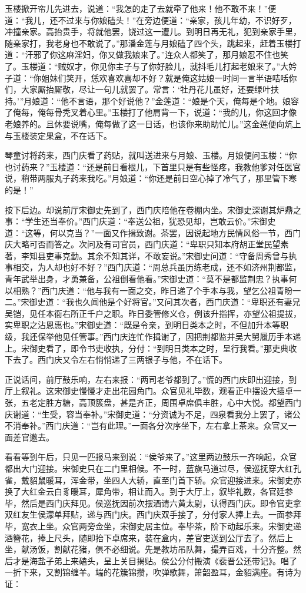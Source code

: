 玉楼掀开帘儿先进去，说道：“我怎的走了去就牵了他来！他不敢不来！”便道：“我儿，还不过来与你娘磕头！”在旁边便道：“亲家，孩儿年幼，不识好歹，冲撞亲家。高抬贵手，将就他罢，饶过这一遭儿。到明日再无礼，犯到亲家手里，随亲家打，我老身也不敢说了。”那潘金莲与月娘磕了四个头，跳起来，赶着玉楼打道：“汗邪了你这麻淫妇，你又做我娘来了。”连众人都笑了，那月娘忍不住也笑了。玉楼道：“贼奴才，你见你主子与了你好脸儿，就抖毛儿打起老娘来了。”大妗子道：“你姐妹们笑开，恁欢喜欢喜却不好？就是俺这姑娘一时间一言半语咭咶你们，大家厮抬厮敬，尽让一句儿就罢了。常言：‘牡丹花儿虽好，还要绿叶扶持。’”月娘道：“他不言语，那个好说他？”金莲道：“娘是个天，俺每是个地。娘容了俺每，俺每骨秃叉着心里。”玉楼打了他肩背一下，说道：“我的儿，你这回才像老娘养的。且休要说嘴，俺每做了这一日话，也该你来助助忙儿。”这金莲便向炕上与玉楼装定果盒，不在话下。

琴童讨将药来，西门庆看了药贴，就叫送进来与月娘、玉楼。月娘便问玉楼：“你也讨药来？”玉楼道：“还是前日看根儿，下首里只是有些怪疼，我教他爹对任医官说，稍带两服丸子药来我吃。”月娘道：“你还是前日空心掉了冷气了，那里管下寒的是！”

按下后边。却说前厅宋御史先到了，西门庆陪他在卷棚内坐。宋御史深谢其炉鼎之事：“学生还当奉价。”西门庆道：“奉送公祖，犹恐见却，岂敢云价。”宋御史道：“这等，何以克当？”一面又作揖致谢。茶罢，因说起地方民情风俗一节，西门庆大略可否而答之。次问及有司官员，西门庆道：“卑职只知本府胡正堂民望素著，李知县吏事克勤。其余不知其详，不敢妄说。”宋御史问道：“守备周秀曾与执事相交，为人却也好不好？”西门庆道：“周总兵虽历练老成，还不如济州荆都监，青年武举出身，才勇兼备，公祖倒看他看。”宋御史道：“莫不是都监荆忠？执事何以相熟？”西门庆道：“他与我有一面之交，昨日递了个手本与我，望乞公祖青盼一二。”宋御史道：“我也久闻他是个好将官。”又问其次者，西门庆道：“卑职还有妻兄吴铠，见任本衙右所正千户之职。昨日委管修义仓，例该升指挥，亦望公祖提拔，实卑职之沾恩惠也。”宋御史道：“既是令亲，到明日类本之时，不但加升本等职级，我还保举他见任管事。”西门庆连忙作揖谢了，因把荆都监并吴大舅履历手本递上。宋御史看了，即令书吏收执，分付：“到明日类本之时，呈行我看。”那吏典收下去了。西门庆又令左右悄悄递了三两银子与他，不在话下。

正说话间，前厅鼓乐响，左右来报：“两司老爷都到了。”慌的西门庆即出迎接，到厅上叙礼。这宋御史慢慢才走出花园角门。众官见礼毕数，观看正中摆设大插卓一张，五老定胜方糖，高顶簇盘，甚是齐正，周围卓席俱丰胜，心中大悦。都望西门庆谢道：“生受，容当奉补。”宋御史道：“分资诚为不足，四泉看我分上罢了，诸公不消奉补。”西门庆道：“岂有此理。”一面各分次序坐下，左右拿上茶来。众官又一面差官邀去。

看看等到午后，只见一匹报马来到说：“侯爷来了。”这里两边鼓乐一齐响起，众官都出大门迎接。宋御史只在二门里相候。不一时，蓝旗马道过尽，侯巡抚穿大红孔雀，戴貂鼠暖耳，浑金带，坐四人大轿，直至门首下轿。众官迎接进来。宋御史亦换了大红金云白豸暖耳，犀角带，相让而入。到于大厅上，叙毕礼数，各官廷参毕，然后是西门庆拜见。侯巡抚因前次摆酒请六黄太尉，认得西门庆。即令官吏拿双红友生侯濛单拜贴，递与西门庆。西门庆双手接了，分付家人捧上去。一面参拜毕，宽衣上坐。众官两旁佥坐，宋御史居主位。奉毕茶，阶下动起乐来。宋御史递酒簪花，捧上尺头，随即抬下卓席来，装在盒内，差官吏送到公厅去了。然后上坐，献汤饭，割献花猪，俱不必细说。先是教坊吊队舞，撮弄百戏，十分齐整。然后才是海盐子弟上来磕头，呈上关目揭贴。侯公分付搬演《裴晋公还带记》。唱了一折下来，又割锦缠羊。端的花簇锦攒，吹弹歌舞，箫韶盈耳，金貂满座。有诗为证：

